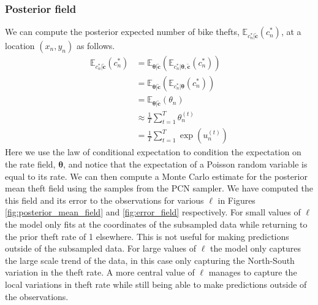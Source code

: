 \documentclass[11pt]{article}
\begin{document}
\subsubsection{Posterior field}
We can compute the posterior expected number of bike thefts, $\mathbb{E}_{c_n^*|\tilde{\boldsymbol{c}}}(c_n^*)$, at a location $(x_n, y_n)$ as follows.
\begin{equation}
    \begin{aligned}
        \mathbb{E}_{c_n^*|\tilde{\boldsymbol{c}}}(c_n^*) &= \mathbb{E}_{\boldsymbol{\theta}|\tilde{\boldsymbol{c}}}(\mathbb{E}_{c_n^*|\boldsymbol{\theta}, \tilde{\boldsymbol{c}}}(c_n^*)) \\
          &= \mathbb{E}_{\boldsymbol{\theta}|\tilde{\boldsymbol{c}}}(\mathbb{E}_{c_n^*|\boldsymbol{\theta}}(c_n^*)) \\
          &= \mathbb{E}_{\boldsymbol{\theta}|\tilde{\boldsymbol{c}}}(\theta_n) \\
          &\approx \frac{1}{T} \sum_{t=1}^{T} \theta_n^{(t)} \\
          &= \frac{1}{T} \sum_{t=1}^{T} \exp(u_n^{(t)})
    \end{aligned}
\end{equation}
Here we use the law of conditional expectation to condition the expectation on the rate field, $\boldsymbol{\theta}$, and notice that the expectation of a Poisson random variable is equal to its rate. We can then compute a Monte Carlo estimate for the posterior mean theft field using the samples from the PCN sampler. We have computed the this field and its error to the observations for various $\ell$ in Figures \ref{fig:posterior_mean_field} and \ref{fig:error_field} respectively. For small values of $\ell$ the model only fits at the coordinates of the subsampled data while returning to the prior theft rate of 1 elsewhere. This is not useful for making predictions outside of the subsampled data. For large values of $\ell$ the model only captures the large scale trend of the data, in this case only capturing the North-South variation in the theft rate. A more central value of $\ell$ manages to capture the local variations in theft rate while still being able to make predictions outside of the observations. 
\end{document}

